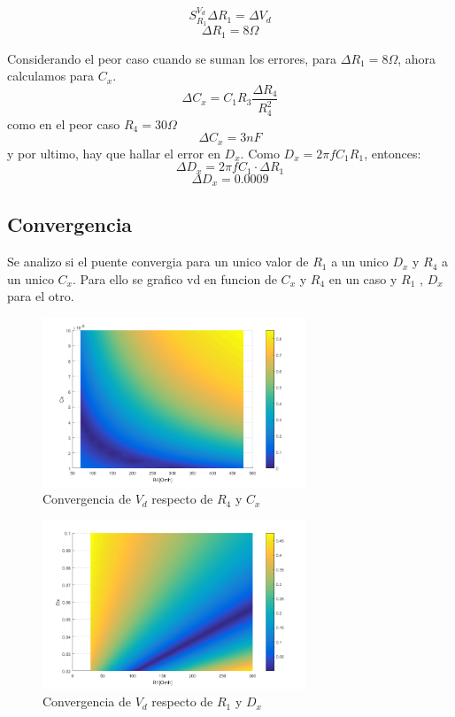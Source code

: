 \documentclass[../../main.tex]{subfiles}
\begin{document}
$$S_{R_1}^{V_d} \Delta R_1=\Delta V_d$$
$$\Delta R_1 = 8\Omega$$

Considerando el peor caso cuando se suman los errores, para $\Delta R_1 = 8\Omega$, ahora calculamos para $C_x$.
$$\Delta C_x = C_1 R_3 \frac{\Delta R_4}{R_4^2} $$
como en el peor caso $R_4=30\Omega$
$$\Delta C_x=3nF $$
y por ultimo, hay que hallar el error en $D_x$. Como $D_x=2\pi f  C_1 R_1$, entonces:
$$ \Delta D_x= 2 \pi  f  C_1 \cdot \Delta R_1 $$
$$ \Delta D_x=0.0009$$

\subsection{Convergencia}
Se analizo si el puente convergia para un unico valor de $R_1$ a un unico $D_x$ y $R_4$ a un unico $C_x$. Para ello se grafico vd en funcion de $C_x$ y $R_4$ en un caso y $R_1$ , $D_x$ para el otro.

\begin{figure}[H]	
	\centering
	\includegraphics[width=0.7\textwidth]{fotos/conv_cx.png}
	\caption{Convergencia de $V_d$ respecto de $R_4$ y $C_x$ } 
\end{figure}

\begin{figure}[H]	
	\centering
	\includegraphics[width=0.7\textwidth]{fotos/conv_dx.png}
	\caption{Convergencia de $V_d$ respecto de $R_1$ y $D_x$ } 
\end{figure}
\end{document}
